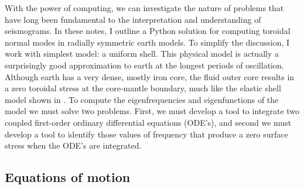 \documentclass[11pt,titlepage,fleqn]{article}
\begin{document}
With the power of computing, we can investigate the nature of problems that have long been fundamental to the interpretation and understanding of seismograms. In these notes, I outline a Python solution for computing toroidal normal modes in radially symmetric earth models. To simplify the discussion, I work with simplest model: a uniform shell. This physical model is actually a surprisingly good approximation to earth at the longest periods of oscillation. Although earth has a very dense, mostly iron core, the fluid outer core results in a zero toroidal stress at the core-mantle boundary, much like the elastic shell model shown in . To compute the eigenfrequencies and eigenfunctions of the model we must solve two problems. First, we must develop a tool to integrate two coupled first-order ordinary differential equations (ODE's), and second we must develop a tool to identify those values of frequency that produce a zero surface stress when the ODE's are integrated.

\subsection{Equations of motion}
\end{document}

